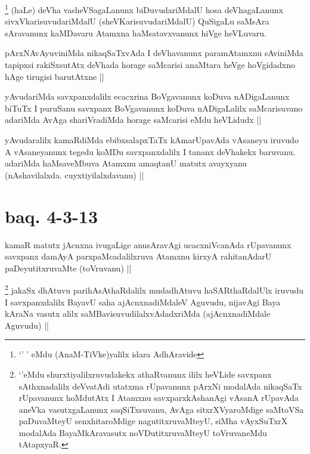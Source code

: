 \begin{artha}
\footnote[1]{`\stext' \stext' eMdu (AnaM-TiVke)yalilx idara AdhAravide}
(haLe) deVha vasheVSagaLanunx biDuvudariMdalU hosa deVhagaLanunx sivxVkarisuvudariMdalU (sheVKarisuvudariMdalU) QuSigaLu saMsAra sAravanunx kaMDavaru Atamxna haMsatavxvanunx hiVge heVLuvaru.
\end{artha}


\begin{artha}
pArxNAvAyuviniMda nikaqSaTxvAda I deVhavanunx paramAtamxnu sAviniMda tapipxsi rakiSxsutAtx deVhada horage saMcarisi anaMtara heVge hoVgidadxno hAge tirugisi barutAtxne ||
\end{artha}


\begin{artha}
yAvudariMda savxpanxdalilx ecacxrina BoVgavanunx koDuva nADigaLanunx biTuTx I puruSanu savxpanx BoVgavanunx koDuva nADigaLalilx saMcarisuvano adariMda AvAga shariVradiMda horage saMcarisi eMdu heVLidudx ||
\end{artha}

\begin{artha}
yAvudaralilx kamaRdiMda ebibxsalapxTaTx kAmarUpavAda vAsaneyu iruvudo A vAsaneyanunx tegedu koMDu savxpanxdalilx I tananx deVhakekx baruvanu. adariMda haMsaveMbuva Atamxnu amaqtanU matutx avayxyanu (nAshavilalxda. cuyxtiyilalxdavanu) ||
\end{artha}

\section*{baq. 4-3-13}


\begin{artha}
kamaR matutx jAcnxna ivugaLige anusAravAgi ucacxniVcanAda rUpavanunx savxpanx damAyA parxpaMcadalilxruva Atamxnu kirxyA rahitanAdarU paDeyutitxruvaMte (toVruvanu) ||
\end{artha}


\begin{artha}
\footnote[1]{`\stext'eMdu shurxtiyalilxruvudakekx athaRvanunx ililx heVLide savxpanx sAthxnadalilx deVvatAdi utatxma rUpavanunx pArxNi modalAda nikaqSaTx rUpavanunx hoMdutAtx I Atamxnu savxparxkAshanAgi vAsanA rUpavAda aneVka vasutxgaLanunx saqSiTxsuvanu, AvAga sitxrXVyaroMdige saMtoVSa paDuvaMteyU senxhitaroMdige nagutitxruvaMteyU, siMha vAyxSuTxrX modalAda BayaMkAravasutx noVDutitxruvaMteyU toVruvaneMdu tAtapxyaR.}
jakaSx dhAtuvu parihAsAthaRdalilx mudadhAtuvu haSARthaRdalUlx iruvudu I savxpanxdalilx BayavU saha ajAcnxnadiMdaleV Aguvudu, nijavAgi Baya kAraNa vasutx alilx saMBavisuvudilalxvAdadxriMda (ajAcnxnadiMdale Aguvudu) ||
\end{artha}

